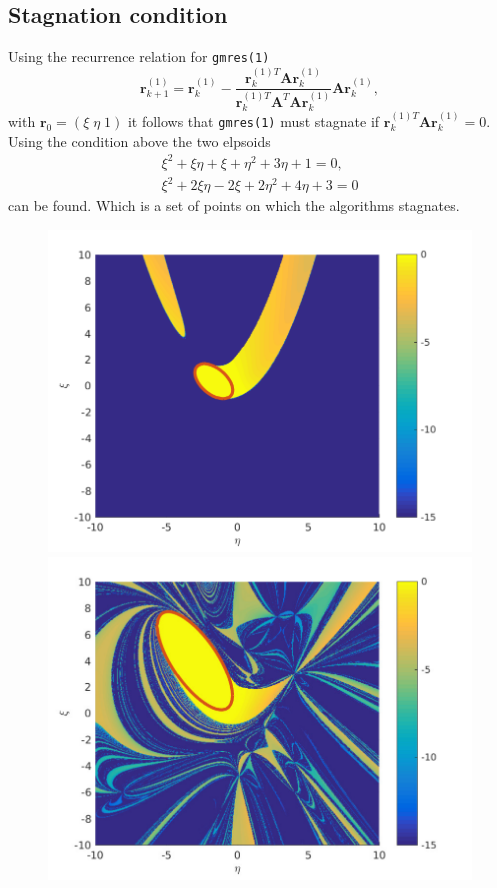 \subsection{Stagnation condition}
Using the recurrence relation for \texttt{gmres(1)}
\begin{equation}
\mathbf{r}_{k+1}^{(1)} = \mathbf{r}_{k}^{(1)} - \frac{\mathbf{r}_{k}^{(1)T}\mathbf{A}\mathbf{r}_{k}^{(1)}}{\mathbf{r}_{k}^{(1)T}\mathbf{A}^{T}\mathbf{A}\mathbf{r}_{k}^{(1)}} \mathbf{A}\mathbf{r}_{k}^{(1)},
\end{equation}
with $\mathbf{r}_{0} = (\xi \; \eta \; 1)$ it follows that \texttt{gmres(1)} must stagnate if $\mathbf{r}_{k}^{(1)T}\mathbf{A}\mathbf{r}_{k}^{(1)} = 0$. Using the condition above the two elpsoids
\begin{align}
\xi^2 + \xi \eta + \xi + \eta^2 + 3\eta + 1 = 0, \\
\xi^2 + 2\xi \eta -2\xi + 2\eta^2 + 4\eta + 3 = 0
\end{align}
can be found. Which is a set of points on which the algorithms stagnates.
\begin{figure}
\centering
\includegraphics[width=0.45\linewidth]{../src/figure/gmresOneConvA}
\includegraphics[width=0.45\linewidth]{../src/figure/gmresOneConvB}
\caption{}
\label{fig:gmresOneConv}
\end{figure}



